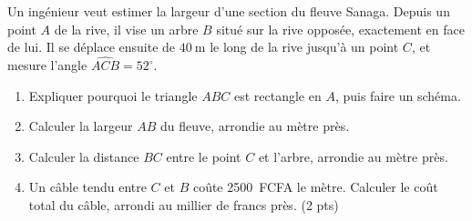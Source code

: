 \documentclass[11pt]{article}
\begin{document}
\begin{exercice}
Un ingénieur veut estimer la largeur d'une section du fleuve Sanaga. Depuis un point $A$ de la rive, il vise un arbre $B$ situé sur la rive opposée, exactement en face de lui. Il se déplace ensuite de $\SI{40}{\meter}$ le long de la rive jusqu'à un point $C$, et mesure l'angle $\widehat{ACB} = 52^\circ$.
\begin{enumerate}
\item Expliquer pourquoi le triangle $ABC$ est rectangle en $A$, puis faire un schéma.
\item Calculer la largeur $AB$ du fleuve, arrondie au mètre près.
\item Calculer la distance $BC$ entre le point $C$ et l'arbre, arrondie au mètre près.
\item Un câble tendu entre $C$ et $B$ coûte \SI{2500}{FCFA} le mètre. Calculer le coût total du câble, arrondi au millier de francs près. \hfill (2 pts)
\end{enumerate}
\end{exercice}
\end{document}

